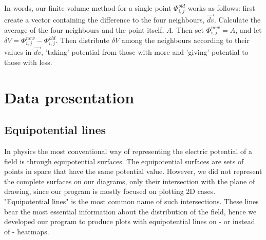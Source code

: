 \documentclass[aps,twocolumn,pre,nofootinbib,10pt]{revtex4-1}
\begin{document}
In words, our finite volume method for a single point $\Phi_{i,j}^{old}$ works as follows: first create a vector containing the difference to the four neighbours, $\vec{dv}$. Calculate the average of the four neighbours and the point itself, $A$. Then set $\Phi_{i,j}^{new} = A$, and let $\delta V = \Phi_{i,j}^{new} - \Phi_{i,j}^{old}$. Then distribute $\delta V$ among the neighbours according to their values in $\vec{dv}$, 'taking' potential from those with more and 'giving' potential to those with less.


\section{Data presentation}
\subsection{Equipotential lines}
In physics the most conventional way of representing the electric potential of a field is through equipotential surfaces. The equipotential surfaces are sets of points in space that have the same potential value. However, we did not represent the complete surfaces on our diagrams, only their intersection with the plane of drawing, since our program is mostly focused on plotting 2D cases. "Equipotential lines" is the most common name of such intersections. These lines bear the most essential information about the distribution of the field, hence we developed our program to produce plots with equipotential lines on - or instead of - heatmaps.
\end{document}
